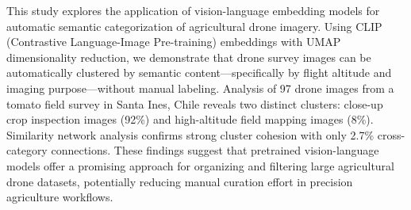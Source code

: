 
This study explores the application of vision-language embedding models for automatic semantic categorization of agricultural drone imagery. Using CLIP (Contrastive Language-Image Pre-training) embeddings with UMAP dimensionality reduction, we demonstrate that drone survey images can be automatically clustered by semantic content---specifically by flight altitude and imaging purpose---without manual labeling. Analysis of 97 drone images from a tomato field survey in Santa Ines, Chile reveals two distinct clusters: close-up crop inspection images (92\%) and high-altitude field mapping images (8\%). Similarity network analysis confirms strong cluster cohesion with only 2.7\% cross-category connections. These findings suggest that pretrained vision-language models offer a promising approach for organizing and filtering large agricultural drone datasets, potentially reducing manual curation effort in precision agriculture workflows.

